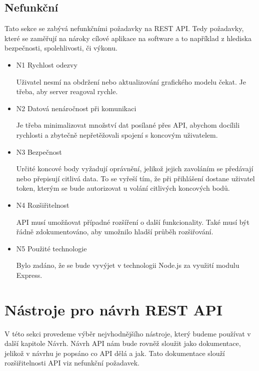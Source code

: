 \documentclass[thesis=B,czech]{FITthesis}[2012/06/26]
\begin{document}
        \subsection{Nefunkční}
            Tato sekce se zabývá nefunkčními požadavky na REST API. Tedy požadavky, které se zaměřují na nároky cílové aplikace na software a to například z hlediska bezpečnosti, spolehlivosti, či výkonu.
            \begin{itemize}
                \item N1 Rychlost odezvy

                    Uživatel nesmí na obdržení nebo aktualizování grafického modelu čekat. Je třeba, aby server reagoval rychle.
                \item N2 Datová nenáročnost při komunikaci

                    Je třeba minimalizovat množství dat posílané přes API, abychom docílili rychlosti a zbytečně nepřetěžovali spojení s koncovým uživatelem.
                \item N3 Bezpečnost
                    
                    Určité koncové body vyžadují oprávnění, jelikož jejich zavoláním se předávají nebo přepisují citlivá data. To se vyřeší tím, že při přihlášení dostane uživatel token, kterým se bude autorizovat u volání citlivých koncových bodů.
                \item N4 Rozšiřitelnost

                    API musí umožňovat případné rozšíření o další funkcionality. Také musí být řádně zdokumentováno, aby umožnilo hladší průběh rozšiřování.
                \item N5 Použité technologie

                    Bylo zadáno, že se bude vyvýjet v technologii Node.js za využití modulu Express.
            \end{itemize}
    \section{Nástroje pro návrh REST API}
        V této sekci provedeme výběr nejvhodnějšího nástroje, který budeme používat v další kapitole Návrh.
        Návrh API nám bude rovněž sloužit jako dokumentace, jelikož v návrhu je popsáno co API dělá a jak. Tato dokumentace slouží rozšiřitelnosti API viz nefunkční požadavek.
        
\end{document}
